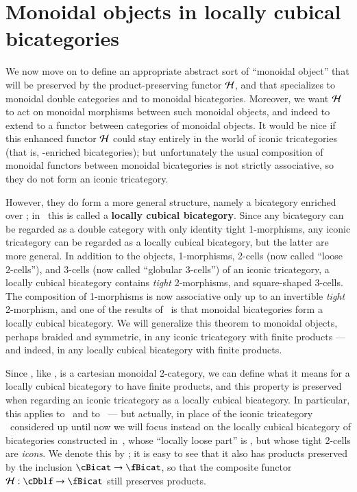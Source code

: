 \section{Monoidal objects in locally cubical bicategories}
\label{sec:mono-objects}

We now move on to define an appropriate abstract sort of ``monoidal object'' that will be preserved by the product-preserving functor $\mathcal{H}$, and that specializes to monoidal double categories and to monoidal bicategories.
Moreover, we want $\mathcal{H}$ to act on monoidal morphisms between such monoidal objects, and indeed to extend to a functor between categories of monoidal objects.
It would be nice if this enhanced functor $\mathcal{H}$ could stay entirely in the world of iconic tricategories (that is, \Icon-enriched bicategories); but unfortunately the usual composition of monoidal functors between monoidal bicategories is not strictly associative, so they do not form an iconic tricategory.

However, they do form a more general structure, namely a bicategory enriched over \cDbl; in~\cite{gg:ldstr-tricat} this is called a \textbf{locally cubical bicategory}.
Since any bicategory can be regarded as a double category with only identity tight 1-morphisms, any iconic tricategory can be regarded as a locally cubical bicategory, but the latter are more general.
In addition to the objects, 1-morphisms, 2-cells (now called ``loose 2-cells''), and 3-cells (now called ``globular 3-cells'') of an iconic tricategory, a locally cubical bicategory contains \emph{tight} 2-morphisms, and square-shaped 3-cells.
The composition of 1-morphisms is now associative only up to an invertible \emph{tight} 2-morphism, and one of the results of~\cite{gg:ldstr-tricat} is that monoidal bicategories form a locally cubical bicategory.
We will generalize this theorem to monoidal objects, perhaps braided and symmetric, in any iconic tricategory with finite products --- and indeed, in any locally cubical bicategory with finite products.

Since \cDbl, like \Icon, is a cartesian monoidal 2-category, we can define what it means for a locally cubical bicategory to have finite products, and this property is preserved when regarding an iconic tricategory as a locally cubical bicategory.
In particular, this applies to \cDblf\ and to \cBicat\ --- but actually, in place of the iconic tricategory \cBicat\ considered up until now we will focus instead on the locally cubical bicategory of bicategories constructed in~\cite{gg:ldstr-tricat}, whose ``locally loose part'' is \cBicat, but whose tight 2-cells are \emph{icons}.
We denote this by \fBicat; it is easy to see that it also has products preserved by the inclusion $\cBicat\to \fBicat$, so that the composite functor $\cH : \cDblf \to\fBicat$ still preserves products.

